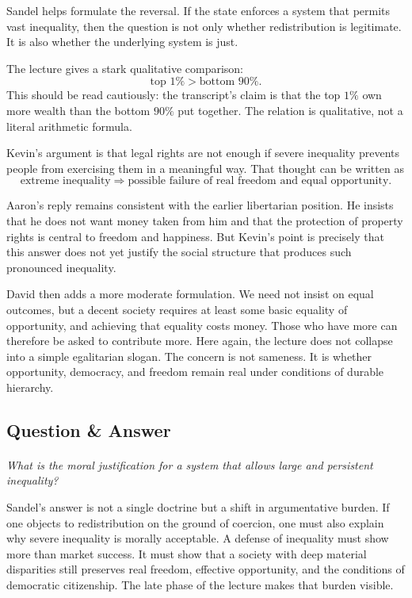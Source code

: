 Sandel helps formulate the reversal. If the state enforces a system that permits vast inequality, then the question is not only whether redistribution is legitimate. It is also whether the underlying system is just.

The lecture gives a stark qualitative comparison:
\begin{equation}
\text{top }1\%
>
\text{bottom }90\%.
\end{equation}
This should be read cautiously: the transcript's claim is that the top \(1\%\) own more wealth than the bottom \(90\%\) put together. The relation is qualitative, not a literal arithmetic formula.

Kevin's argument is that legal rights are not enough if severe inequality prevents people from exercising them in a meaningful way. That thought can be written as
\begin{equation}
\text{extreme inequality}
\Longrightarrow
\text{possible failure of real freedom and equal opportunity}.
\end{equation}

Aaron's reply remains consistent with the earlier libertarian position. He insists that he does not want money taken from him and that the protection of property rights is central to freedom and happiness. But Kevin's point is precisely that this answer does not yet justify the social structure that produces such pronounced inequality.

David then adds a more moderate formulation. We need not insist on equal outcomes, but a decent society requires at least some basic equality of opportunity, and achieving that equality costs money. Those who have more can therefore be asked to contribute more. Here again, the lecture does not collapse into a simple egalitarian slogan. The concern is not sameness. It is whether opportunity, democracy, and freedom remain real under conditions of durable hierarchy.

\subsection{Question \& Answer}

\paragraph{}
\emph{What is the moral justification for a system that allows large and persistent inequality?}

Sandel's answer is not a single doctrine but a shift in argumentative burden. If one objects to redistribution on the ground of coercion, one must also explain why severe inequality is morally acceptable. A defense of inequality must show more than market success. It must show that a society with deep material disparities still preserves real freedom, effective opportunity, and the conditions of democratic citizenship. The late phase of the lecture makes that burden visible.

